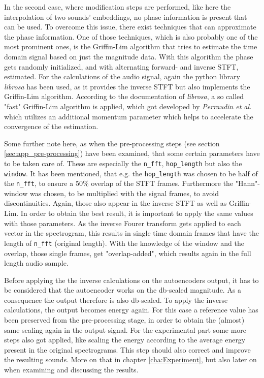 In the second case, where modification steps are performed, like here the interpolation of two sounds' embeddings, no phase information is present that can be used. To overcome this issue, there exist techniques that can approximate the phase information. One of those techniques, which is also probably one of the most prominent ones, is the Griffin-Lim \cite{Griffin1984} algorithm that tries to estimate the time domain signal based on just the magnitude data. With this algorithm the phase gets randomly initialized, and with alternating forward- and inverse STFT, estimated. For the calculations of the audio signal, again the python library \textit{librosa} \cite{brian_mcfee_2022_6097378} has been used, as it provides the inverse STFT but also implements the Griffin-Lim algorithm. According to the documentation of \textit{librosa}, a so called "fast" Griffin-Lim algorithm is applied, which got developed by \textit{Perraudin et al.} \cite{Perraudin2013} which utilizes an additional momentum parameter which helps to accelerate the convergence of the estimation. 

Some further note here, as when the pre-processing steps (see section \ref{sec:app_pre-processing}) have been examined, that some certain parameters have to be taken care of. These are especially the \texttt{n\_fft}, \texttt{hop\_length} but also the \texttt{window}. It has been mentioned, that e.g. the \texttt{hop\_length} was chosen to be half of the \texttt{n\_fft}, to ensure a 50\% overlap of the STFT frames. Furthermore the "Hann"-window was chosen, to be multiplied with the signal frames, to avoid discontinuities. Again, those also appear in the inverse STFT as well as Griffin-Lim. In order to obtain the best result, it is important to apply the same values with those parameters. As the inverse Fourer transform gets applied to each vector in the spectrogram, this results in single time domain frames that have the length of \texttt{n\_fft} (original length). With the knowledge of the window and the overlap, those single frames, get "overlap-added", which results again in the full length audio sample. 

Before applying the the inverse calculations on the autoencoders output, it has to be considered that the autoencoder works on the db-scaled magnitude. As a consequence the output therefore is also db-scaled. To apply the inverse calculations, the output becomes energy again. For this case a reference value has been preserved from the pre-processing stage, in order to obtain the (almost) same scaling again in the output signal. For the experimental part some more steps also got applied, like scaling the energy according to the average energy present in the original spectrograms. This step should also correct and improve the resulting sounds. More on that in chapter \ref{cha:Experiment}, but also later on when examining and discussing the results.



